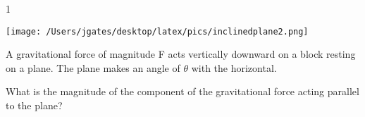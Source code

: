 
\AddToShipoutPicture*{\BackgroundPic}

\addtocounter {ProbNum} {1}

\begin{floatingfigure}[r]{.25\textwidth}
\texttt{[image: /Users/jgates/desktop/latex/pics/inclinedplane2.png]}
\end{floatingfigure}
 
{\bf \Large{}} A gravitational force of magnitude F acts vertically downward on a block resting on a plane. The plane makes an angle of $\theta$ with the horizontal. 

\bigskip

\indent What is the magnitude of the component of the gravitational force acting parallel to the plane? 

\vfill

\newpage
